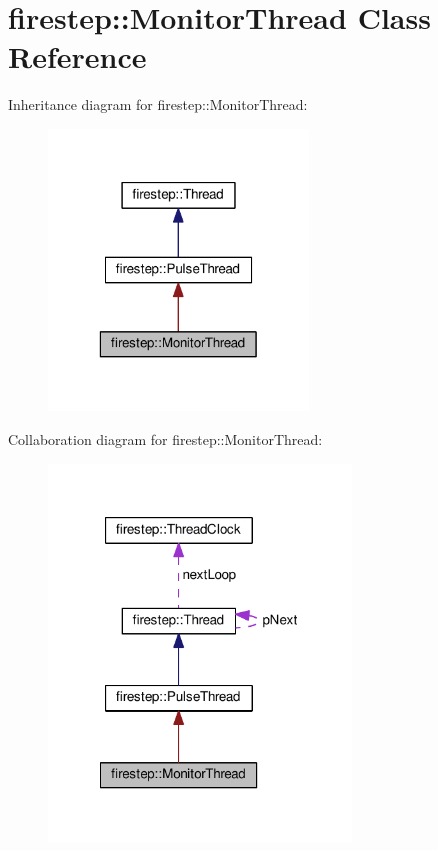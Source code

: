 \hypertarget{classfirestep_1_1_monitor_thread}{\section{firestep\+:\+:Monitor\+Thread Class Reference}
\label{classfirestep_1_1_monitor_thread}
}


Inheritance diagram for firestep\+:\+:Monitor\+Thread\+:\nopagebreak
\begin{figure}[H]
\begin{center}
\leavevmode
\includegraphics[width=196pt]{classfirestep_1_1_monitor_thread__inherit__graph}
\end{center}
\end{figure}


Collaboration diagram for firestep\+:\+:Monitor\+Thread\+:\nopagebreak
\begin{figure}[H]
\begin{center}
\leavevmode
\includegraphics[width=228pt]{classfirestep_1_1_monitor_thread__coll__graph}
\end{center}
\end{figure}
